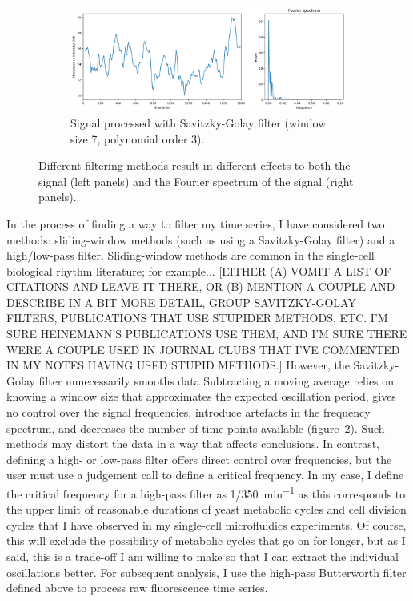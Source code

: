 \begin{figure}
\begin{subfigure}[htpb]{0.8\textwidth}
   \centering
   \includegraphics[width=\textwidth]{fft_savgol}
   \caption{
     Signal processed with Savitzky-Golay filter (window size 7, polynomial order 3).
   }
   \label{fig:analysis-filter-savgol}
  \end{subfigure}
  \caption{
    Different filtering methods result in different effects to both the signal (left panels) and the Fourier spectrum of the signal (right panels).
  }
  \label{fig:analysis-filter}
\end{figure}

In the process of finding a way to filter my time series, I have considered two methods: sliding-window methods (such as using a Savitzky-Golay filter) and a high/low-pass filter.
Sliding-window methods are common in the single-cell biological rhythm literature; for example... [EITHER (A) VOMIT A LIST OF CITATIONS AND LEAVE IT THERE, OR (B) MENTION A COUPLE AND DESCRIBE IN A BIT MORE DETAIL, GROUP SAVITZKY-GOLAY FILTERS, PUBLICATIONS THAT USE STUPIDER METHODS, ETC.  I'M SURE HEINEMANN'S PUBLICATIONS USE THEM, AND I'M SURE THERE WERE A COUPLE USED IN JOURNAL CLUBS THAT I'VE COMMENTED IN MY NOTES HAVING USED STUPID METHODS.]
However, the Savitzky-Golay filter unnecessarily smooths data
Subtracting a moving average relies on knowing a window size that approximates the expected oscillation period, gives no control over the signal frequencies, introduce artefacts in the frequency spectrum, and decreases the number of time points available (figure~\ref{fig:analysis-filter}).
Such methods may distort the data in a way that affects conclusions.
In contrast, defining a high- or low-pass filter offers direct control over frequencies, but the user must use a judgement call to define a critical frequency.
In my case, I define the critical frequency for a high-pass filter as \SI{1/350}{\minute^{-1}} as this corresponds to the upper limit of reasonable durations of yeast metabolic cycles and cell division cycles that I have observed in my single-cell microfluidics experiments.
Of course, this will exclude the possibility of metabolic cycles that go on for longer, but as I said, this is a trade-off I am willing to make so that I can extract the individual oscillations better.
For subsequent analysis, I use the high-pass Butterworth filter defined above to process raw fluorescence time series.

